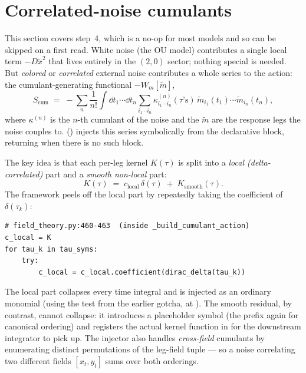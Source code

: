 \section{Correlated-noise cumulants}\label{sec:cumulant}

This section covers step~4, which is a no-op for most models and so can be skipped on
a first read. White noise (the OU model) contributes a single local term
$-D\tilde x^2$ that lives entirely in the $(2,0)$ sector; nothing special is needed.
But \emph{colored} or \emph{correlated} external noise contributes a whole series to
the action: the cumulant-generating functional $-W_m[\tilde m]$,
\[
  S_{\mathrm{cum}} \;=\; -\sum_n \frac{1}{n!}\int \dd t_1\cdots\dd t_n
     \sum_{i_1\cdots i_n} \kappa^{(n)}_{i_1\cdots i_n}(\tau\text{'s})\,
     \tilde m_{i_1}(t_1)\cdots\tilde m_{i_n}(t_n),
\]
where $\kappa^{(n)}$ is the $n$-th cumulant of the noise and the $\tilde m$ are the
response legs the noise couples to. 
() injects this series symbolically from the declarative
 block, returning  when there is no such
block.

The key idea is that each per-leg kernel $K(\tau)$ is split into a
\emph{local (delta-correlated)} part and a \emph{smooth non-local} part:
\[
  K(\tau) \;=\; c_{\mathrm{local}}\,\delta(\tau) \;+\; K_{\mathrm{smooth}}(\tau).
\]
The framework peels off the local part by repeatedly taking the coefficient of
$\delta(\tau_k)$:

\begin{lstlisting}
# field_theory.py:460-463  (inside _build_cumulant_action)
c_local = K
for tau_k in tau_syms:
    try:
        c_local = c_local.coefficient(dirac_delta(tau_k))
\end{lstlisting}

The local part collapses every time integral and is injected as an ordinary monomial
(using the  test from the earlier gotcha, at
). The smooth residual, by contrast, cannot collapse: it
introduces a placeholder symbol  (the  prefix again for
canonical ordering) and registers the actual kernel function in
 for the downstream integrator to pick up. The injector
also handles \emph{cross-field} cumulants by enumerating distinct permutations of the
leg-field tuple --- so a noise correlating two different fields $[x_t,y_t]$ sums over
both orderings.

